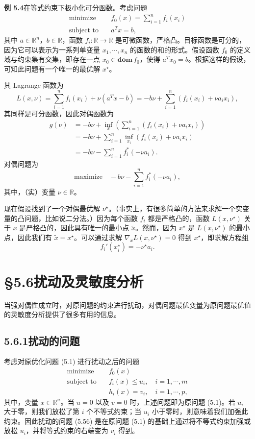 \documentclass[UTF8,12pt,a4paper,fontset=fandol]{ctexart}
\begin{document}
\noindent\textbf{例 5.4}\quad 在等式约束下极小化可分函数。考虑问题
\[
\begin{aligned}
\text{minimize}\quad & f_0(x)=\sum_{i=1}^n f_i(x_i)\\
\text{subject to}\quad & a^Tx=b,
\end{aligned}
\]
其中 $a\in\mathbb{R}^n$，$b\in\mathbb{R}$，函数 $f_i:\mathbb{R}\to\mathbb{R}$ 是可微函数，严格凸。目标函数是可分的，因为它可以表示为一系列单变量 $x_1,\cdots,x_n$ 的函数的和的形式。假设函数 $f_0$ 的定义域与约束集有交集，即存在一点 $x_0\in\mathbf{dom}\,f_0$，使得 $a^Tx_0=b$。根据这样的假设，可知此问题有一个唯一的最优解 $x^\star$。

其 Lagrange 函数为
\[
L(x,\nu)=\sum_{i=1}^n f_i(x_i)+\nu(a^Tx-b)=-b\nu+\sum_{i=1}^n(f_i(x_i)+\nu a_i x_i),
\]
其同样是可分函数，因此对偶函数为
\[
\begin{aligned}
g(\nu)
&=-b\nu+\inf_x\left(\sum_{i=1}^n(f_i(x_i)+\nu a_ix_i)\right)\\
&=-b\nu+\sum_{i=1}^n\inf_{x_i}(f_i(x_i)+\nu a_ix_i)\\
&=-b\nu-\sum_{i=1}^n f_i^\ast(-\nu a_i).
\end{aligned}
\]
对偶问题为
\[
\text{maximize}\quad -b\nu-\sum_{i=1}^n f_i^\ast(-\nu a_i),
\]
其中，（实）变量 $\nu\in\mathbb{R}$。

现在假设找到了一个对偶最优解 $\nu^\star$。（事实上，有很多简单的方法来求解一个实变量的凸问题，比如说二分法。）因为每个函数 $f_i$ 都是严格凸的，函数 $L(x,\nu^\star)$ 关于 $x$ 是严格凸的，因此具有唯一的最小点 $\tilde{x}$。然而，因为 $x^\star$ 是 $L(x,\nu^\star)$ 的最小点，因此我们有 $\tilde{x}=x^\star$。可以通过求解 $\nabla_x L(x,\nu^\star)=0$ 得到 $x^\star$，即求解方程组
\[
f_i'(x_i^\star)=-\nu^\star a_i.
\]

\section*{§5.6\quad 扰动及灵敏度分析}

当强对偶性成立时，对原问题的约束进行扰动，对偶问题最优变量为原问题最优值的灵敏度分析提供了很多有用的信息。

\subsection*{5.6.1\quad 扰动的问题}

考虑对原优化问题 (5.1) 进行扰动之后的问题
\begin{equation}
\begin{aligned}
\text{minimize}\quad & f_0(x)\\
\text{subject to}\quad & f_i(x)\leq u_i,\quad i=1,\cdots,m\\
& h_i(x)=v_i,\quad i=1,\cdots,p,
\end{aligned}
\tag{5.56}
\end{equation}
其中，变量 $x\in\mathbb{R}^n$。当 $u=0$ 以及 $v=0$ 时，上述问题即为原问题 (5.1)。若 $u_i$ 大于零，则我们放松了第 $i$ 个不等式约束；当 $u_i$ 小于零时，则意味着我们加强此约束。因此扰动的问题 (5.56) 是在原问题 (5.1) 的基础上通过将不等式约束加强或放松 $u_i$，并将等式约束的右端变为 $v_i$ 得到。
\end{document}
